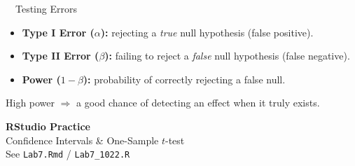 \documentclass[aspectratio=169,11pt]{beamer}
\begin{document}
\begin{frame}{\ \ Testing Errors}
  \begin{keybox}
    \begin{itemize}
      \item \textbf{Type I Error ($\alpha$):} rejecting a \emph{true} null hypothesis (false positive).
      \item \textbf{Type II Error ($\beta$):} failing to reject a \emph{false} null hypothesis (false negative).
      \item \textbf{Power ($1-\beta$):} probability of correctly rejecting a false null.
    \end{itemize}
  \end{keybox}
  \vspace{0.5em}
  \begin{center}
    High power $\Rightarrow$ a good chance of detecting an effect when it truly exists.
  \end{center}
\end{frame}

{
\begin{frame}
  \vfill
  \centering
  {\color{qrnavy}\Huge\bfseries RStudio Practice}\\[0.8em]
  {\color{qrblue}\large Confidence Intervals \& One-Sample $t$-test}\\[0.4em]
  {\color{qrgray} See \texttt{Lab7.Rmd} / \texttt{Lab7\_1022.R}}
  \vfill
\end{frame}
}
\end{document}
